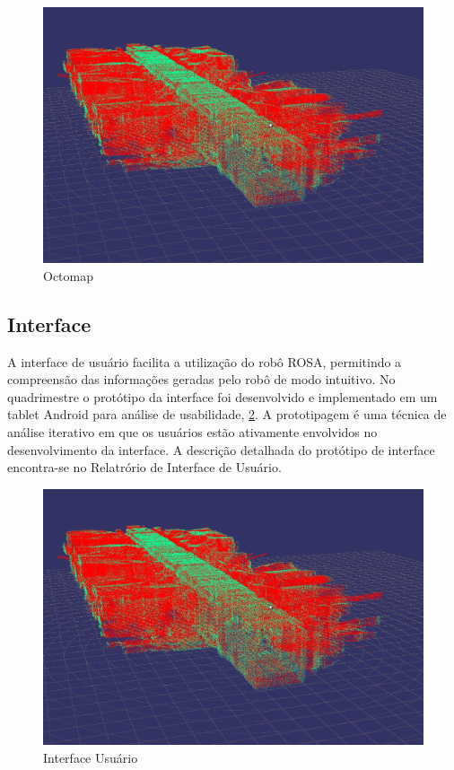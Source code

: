 \begin{figure}[ht!]
    \centering \includegraphics[width=1\columnwidth]{figs/resultados/octomap}
    \caption{Octomap}
    \label{fig:octomap}
\end{figure}

\noindent
\subsection{Interface}

A interface de usuário facilita a utilização do robô ROSA, permitindo a compreensão das informações geradas pelo robô de modo intuitivo. 
No quadrimestre o protótipo da interface foi desenvolvido e implementado em um tablet Android para análise de usabilidade, \ref{fig:userinterface}.   
A prototipagem é uma técnica de análise iterativo em que os usuários estão ativamente envolvidos no desenvolvimento da interface. 
A descrição detalhada do protótipo de interface encontra-se no Relatrório de Interface de Usuário.

\begin{figure}[ht!]
    \centering \includegraphics[width=1\columnwidth]{figs/resultados/octomap}
    \caption{Interface Usuário}
    \label{fig:userinterface}
\end{figure}

